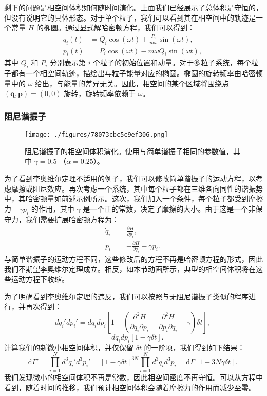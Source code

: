 剩下的问题是相空间体积如何随时间演化。上面我们已经展示了总体积是守恒的，但没有说明它的具体形态。对于单个粒子，我们可以看到其在相空间中的轨迹是一个常量 \( H \) 的椭圆。通过显式解哈密顿方程，我们可以得到：
\[
\begin{aligned}
q_i(t) &= Q_i \cos(\omega t) + \frac{P_i}{m\omega} \sin(\omega t), \\
p_i(t) &= P_i \cos(\omega t) - m\omega Q_i \sin(\omega t),
\end{aligned}~
\]
其中 \( Q_i \) 和 \( P_i \) 分别表示第 \(i\) 个粒子的初始位置和动量。对于多粒子系统，每个粒子都有一个相空间轨迹，描绘出与粒子能量对应的椭圆。椭圆的旋转频率由哈密顿量中的 \( \omega \) 给出，与能量的差异无关。因此，相空间的某个区域将围绕点 \( (\mathbf{q}, \mathbf{p}) = (0, 0) \) 旋转，旋转频率依赖于 \( \omega \)。
\subsubsection{阻尼谐振子}
\begin{figure}[ht]
\centering
\texttt{[image: ./figures/78073cbc5c9ef306.png]}
\caption{阻尼谐振子的相空间体积演化。使用与简单谐振子相同的参数值，其中 \( \gamma = 0.5 \) （\( \alpha = 0.25 \)）。} \label{fig_LWR_3}
\end{figure}
为了看到李奥维尔定理不适用的例子，我们可以修改简单谐振子的运动方程，以考虑摩擦或阻尼效应。再次考虑一个系统，其中每个粒子都在三维各向同性的谐振势中，其哈密顿量如前述示例所示。这次，我们加入一个条件，每个粒子都受到摩擦力 \( -\gamma p_i \) 的作用，其中 \( \gamma \) 是一个正的常数，决定了摩擦的大小。由于这是一个非保守力，我们需要扩展哈密顿方程为：
\[
\begin{aligned}
\dot{q}_i &= \frac{\partial H}{\partial p_i}, \\
\dot{p}_i &= -\frac{\partial H}{\partial q_i} - \gamma p_i.
\end{aligned}~
\]
与简单谐振子的运动方程不同，这些修改后的方程不再是哈密顿方程的形式，因此我们不期望李奥维尔定理成立。相反，如本节动画所示，典型的相空间体积将在这些运动方程下收缩。

为了明确看到李奥维尔定理的违反，我们可以按照与无阻尼谐振子类似的程序进行，并再次得到：
\[
dq_i' dp_i' = dq_i dp_i \left[ 1 + \left( \frac{\partial^2 H}{\partial q_i \partial p_i} - \frac{\partial^2 H}{\partial p_i \partial q_i} - \gamma \right) \delta t \right],~
\]
\[
= dq_i dp_i \left[ 1 - \gamma \delta t \right].~
\]
计算我们的新微小相空间体积，并仅保留 \( \delta t \) 的一阶项，我们得到如下结果：
\[
\mathrm{d} \Gamma' = \prod_{i=1}^{N} d^3q_i' d^3p_i' = \left[ 1 - \gamma \delta t \right]^{3N} \prod_{i=1}^{N} d^3q_i d^3p_i = \mathrm{d} \Gamma \left[ 1 - 3N \gamma \delta t \right].~
\]
我们发现微小的相空间体积不再是常数，因此相空间密度不再守恒。可以从方程中看到，随着时间的推移，我们预计相空间体积会随着摩擦力的作用而减少至零。

